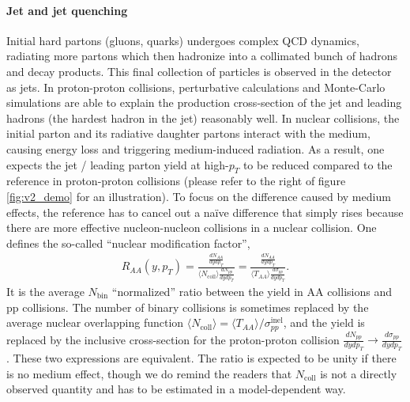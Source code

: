 \paragraph{Jet and jet quenching}
Initial hard partons (gluons, quarks) undergoes complex QCD dynamics, radiating more partons which then hadronize into a collimated bunch of hadrons and decay products.
This final collection of particles is observed in the detector as jets.
In proton-proton collisions, perturbative calculations and Monte-Carlo simulations are able to explain the production cross-section of the jet and leading hadrons (the hardest hadron in the jet) reasonably well.
In nuclear collisions, the initial parton and its radiative daughter partons interact with the medium, causing energy loss and triggering medium-induced radiation.
As a result, one expects the jet / leading parton yield at high-$p_T$ to be reduced compared to the reference in proton-proton collisions (please refer to the right of figure \ref{fig:v2_demo} for an illustration).
To focus on the difference caused by medium effects, the reference has to cancel out a na\"ive difference that simply rises because there are more effective nucleon-nucleon collisions in a nuclear collision.
One defines the so-called ``nuclear modification factor'',
\begin{eqnarray}
R_{AA}(y, p_T) = \frac{\frac{dN_{AA}}{dy dp_T}}{\langle N_{\textrm{coll}}\rangle \frac{dN_{pp}}{dy dp_T}} = \frac{\frac{dN_{AA}}{dy dp_T}}{\langle T_{AA} \rangle \frac{d\sigma_{pp}}{dy dp_T}}.
\end{eqnarray}
It is the average $N_{\textrm{bin}}$ ``normalized'' ratio between the yield in AA collisions and pp collisions.
The number of binary collisions is sometimes replaced by the average nuclear overlapping function $\langle N_{\textrm{coll}}\rangle = \langle T_{AA} \rangle /\sigma_{pp}^{\textrm{inel}}$, and the yield is replaced by the inclusive cross-section for the proton-proton collision $\frac{dN_{pp}}{dy dp_T}\rightarrow \frac{d\sigma_{pp}}{dy dp_T}$.
These two expressions are equivalent.
The ratio is expected to be unity if there is no medium effect, though we do remind the readers that $N_{\textrm{coll}}$ is not a directly observed quantity and has to be estimated in a model-dependent way.

